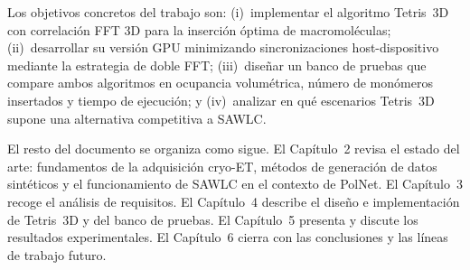 
Los objetivos concretos del trabajo son: (i)~implementar el algoritmo Tetris~3D con
correlación FFT 3D para la inserción óptima de macromoléculas; (ii)~desarrollar su versión GPU
minimizando sincronizaciones host-dispositivo mediante la estrategia de doble FFT; (iii)~diseñar
un banco de pruebas que compare ambos algoritmos en ocupancia volumétrica, número de monómeros
insertados y tiempo de ejecución; y (iv)~analizar en qué escenarios Tetris~3D supone una
alternativa competitiva a SAWLC.

El resto del documento se organiza como sigue. El Capítulo~2 revisa el estado del arte:
fundamentos de la adquisición cryo-ET, métodos de generación de datos sintéticos y el
funcionamiento de SAWLC en el contexto de PolNet. El Capítulo~3 recoge el análisis de
requisitos. El Capítulo~4 describe el diseño e implementación de Tetris~3D y del banco de
pruebas. El Capítulo~5 presenta y discute los resultados experimentales. El Capítulo~6 cierra
con las conclusiones y las líneas de trabajo futuro.
